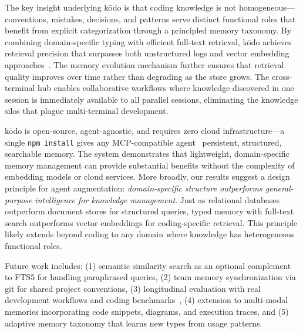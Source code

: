 \documentclass{article}
\begin{document}
The key insight underlying k\=odo is that coding knowledge is not homogeneous---conventions, mistakes, decisions, and patterns serve distinct functional roles that benefit from explicit categorization through a principled memory taxonomy. By combining domain-specific typing with efficient full-text retrieval, k\=odo achieves retrieval precision that surpasses both unstructured logs and vector embedding approaches~\cite{lewis2020rag,gao2023retrieval}. The memory evolution mechanism further ensures that retrieval quality improves over time rather than degrading as the store grows. The cross-terminal hub enables collaborative workflows where knowledge discovered in one session is immediately available to all parallel sessions, eliminating the knowledge silos that plague multi-terminal development.

k\=odo is open-source, agent-agnostic, and requires zero cloud infrastructure---a single \texttt{npm install} gives any MCP-compatible agent~\cite{mcp2024} persistent, structured, searchable memory. The system demonstrates that lightweight, domain-specific memory management can provide substantial benefits without the complexity of embedding models or cloud services. More broadly, our results suggest a design principle for agent augmentation: \emph{domain-specific structure outperforms general-purpose intelligence for knowledge management}. Just as relational databases outperform document stores for structured queries, typed memory with full-text search outperforms vector embeddings for coding-specific retrieval. This principle likely extends beyond coding to any domain where knowledge has heterogeneous functional roles.

Future work includes: (1) semantic similarity search as an optional complement to FTS5 for handling paraphrased queries, (2) team memory synchronization via git for shared project conventions, (3) longitudinal evaluation with real development workflows and coding benchmarks~\cite{jimenez2024swebench}, (4) extension to multi-modal memories incorporating code snippets, diagrams, and execution traces, and (5) adaptive memory taxonomy that learns new types from usage patterns.
\end{document}
